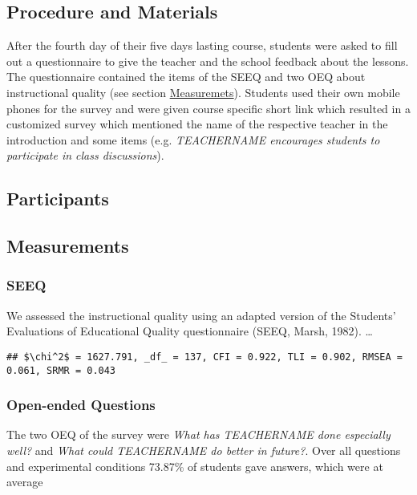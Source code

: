 \documentclass[man]{apa6}
\begin{document}
\hypertarget{procedure-and-materials}{%
\subsection{Procedure and Materials}\label{procedure-and-materials}}

After the fourth day of their five days lasting course, students were asked to fill out a questionnaire to give the teacher and the school feedback about the lessons. The questionnaire contained the items of the SEEQ and two OEQ about instructional quality (see section \protect\hyperlink{measurements}{Measuremets}). Students used their own mobile phones for the survey and were given course specific short link which resulted in a customized survey which mentioned the name of the respective teacher in the introduction and some items (e.g. \emph{TEACHERNAME encourages students to participate in class discussions}).

\hypertarget{participants}{%
\subsection{Participants}\label{participants}}

\hypertarget{measurements}{%
\subsection{Measurements}\label{measurements}}

\hypertarget{seeq}{%
\subsubsection{SEEQ}\label{seeq}}

We assessed the instructional quality using an adapted version of the Students' Evaluations of Educational Quality questionnaire (SEEQ, Marsh, 1982). \ldots{}

\begin{verbatim}
## $\chi^2$ = 1627.791, _df_ = 137, CFI = 0.922, TLI = 0.902, RMSEA = 0.061, SRMR = 0.043
\end{verbatim}

\hypertarget{open-ended-questions}{%
\subsubsection{Open-ended Questions}\label{open-ended-questions}}

The two OEQ of the survey were \emph{What has TEACHERNAME done especially well?} and \emph{What could TEACHERNAME do better in future?}. Over all questions and experimental conditions
73.87\%
of students gave answers, which were at average
\end{document}
